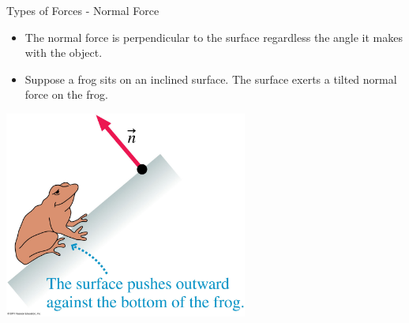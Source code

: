 \documentclass{beamer}
\begin{document}
\begin{frame}{Types of Forces - Normal Force}
\begin{itemize}
   \item The normal force is perpendicular to the surface regardless the angle it makes with the object.
   \item Suppose a frog sits on an inclined surface. The surface exerts a tilted normal force on the frog.
\end{itemize}
\begin{center}
   \includegraphics[width=0.6\textwidth]{../figures/05_07_Figure.jpg}
\end{center}
\end{frame}
\end{document}
